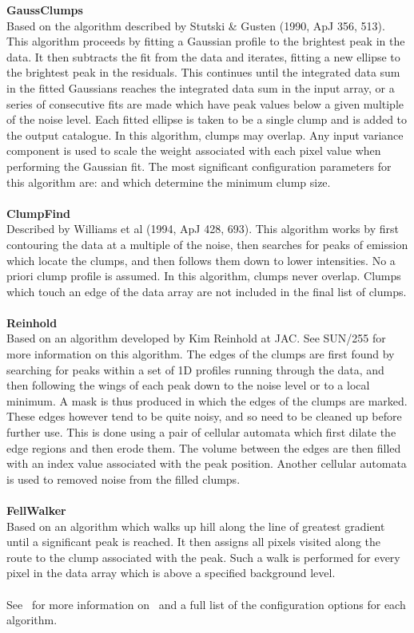 \documentclass[11pt,oneside,chapters]{starlink}
\begin{document}
\textbf{GaussClumps}\\Based on the algorithm described by Stutski \&
Gusten (1990, ApJ 356, 513). This algorithm proceeds by fitting a
Gaussian profile to the brightest peak in the data. It then subtracts
the fit from the data and iterates, fitting a new ellipse to the
brightest peak in the residuals. This continues until the integrated
data sum in the fitted Gaussians reaches the integrated data sum in
the input array, or a series of consecutive fits are made which have
peak values below a given multiple of the noise level. Each fitted
ellipse is taken to be a single clump and is added to the output
catalogue. In this algorithm, clumps may overlap. Any input variance
component is used to scale the weight associated with each pixel value
when performing the Gaussian fit. The most significant configuration
parameters for this algorithm are:  and
 which determine the minimum clump size.
\\\\
\textbf{ClumpFind}\\
Described by Williams et al (1994, ApJ 428, 693). This algorithm works
by first contouring the data at a multiple of the noise, then searches
for peaks of emission which locate the clumps, and then follows them
down to lower intensities. No a priori clump profile is assumed. In
this algorithm, clumps never overlap. Clumps which touch an edge of
the data array are not included in the final list of clumps.
\\\\
\textbf{Reinhold}\\
Based on an algorithm developed by Kim Reinhold at JAC. See SUN/255
for more information on this algorithm. The edges of the clumps are
first found by searching for peaks within a set of 1D profiles running
through the data, and then following the wings of each peak down to
the noise level or to a local minimum. A mask is thus produced in
which the edges of the clumps are marked. These edges however tend to
be quite noisy, and so need to be cleaned up before further use. This
is done using a pair of cellular automata which first dilate the edge
regions and then erode them. The volume between the edges are then
filled with an index value associated with the peak position. Another
cellular automata is used to removed noise from the filled clumps.
\\\\
\textbf{FellWalker}\\
Based on an algorithm which walks up hill along the line of greatest
gradient until a significant peak is reached. It then assigns all
pixels visited along the route to the clump associated with the peak.
Such a walk is performed for every pixel in the data array which is
above a specified background level.
\\\\
See \cupidsun\ for more information on \findclumps\ and a full list of
the configuration options for each algorithm.
\end{document}
